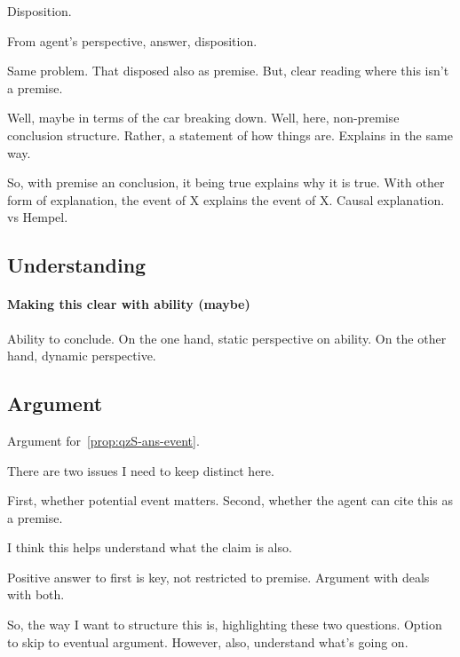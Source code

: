 \begin{note}
  Disposition.

  From agent's perspective, answer, disposition.

  Same problem.
  That disposed also as premise.
  But, clear reading where this isn't a premise.

  Well, maybe in terms of the car breaking down.
  Well, here, non-premise conclusion structure.
  Rather, a statement of how things are.
  Explains in the same way.

  So, with premise an conclusion, it being true explains why it is true.
  With other form of explanation, the event of X explains the event of X.
  Causal explanation.
  \citeauthor{Scriven:1962vq} vs Hempel.
\end{note}


\subsection{Understanding}
\label{sec:understanding}

\paragraph{Making this clear with ability (maybe)}

\begin{note}
  Ability to conclude.
  On the one hand, static perspective on ability.
  On the other hand, dynamic perspective.
\end{note}

\subsection{Argument}
\label{sec:argument-1}

\begin{note}
  Argument for~\autoref{prop:qzS-ans-event}.
\end{note}

\begin{note}
  There are two issues I need to keep distinct here.

  First, whether potential event matters.
  Second, whether the agent can cite this as a premise.

  {
    \color{red}
    I think this helps understand what the claim is also.
  }

  Positive answer to first is key, not restricted to premise.
  Argument with  deals with both.

  So, the way I want to structure this is, highlighting these two questions.
  Option to skip to eventual argument.
  However, also, understand what's going on.
\end{note}

